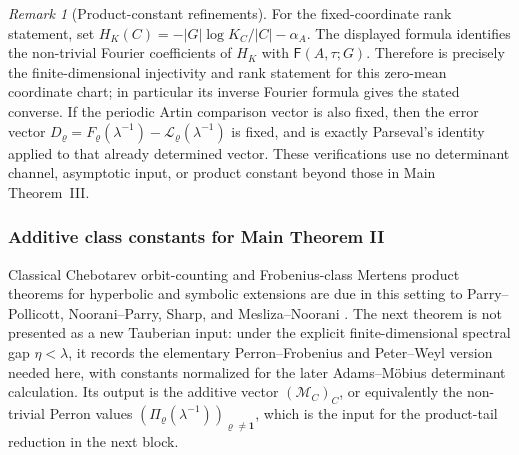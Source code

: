 \documentclass[11pt,a4paper]{amsart}
\theoremstyle{plain}
\theoremstyle{definition}
\theoremstyle{remark}
\newtheorem{remark}[theorem]{Remark}
\begin{document}
\begin{remark}[Product-constant refinements]
  For the fixed-coordinate rank statement, set
  \(H_K(C)=-|G|\log K_C/|C|-\alpha_A\).  The displayed formula identifies the
  non-trivial Fourier coefficients of \(H_K\) with
  \(\mathsf F(A,\tau;G)\).  Therefore
   is precisely the
  finite-dimensional injectivity and rank statement for this zero-mean
  coordinate chart; in particular its inverse Fourier formula gives the stated
  converse.  If the periodic Artin comparison vector is also fixed, then the
  error vector
  \(D_\varrho=F_\varrho(\lambda^{-1})-
  \mathcal L_\varrho(\lambda^{-1})\) is fixed, and
   is exactly Parseval's identity applied to
  that already determined vector.  These verifications use no determinant channel, asymptotic input, or product
constant beyond those in Main Theorem~III.
\end{remark}

\subsubsection{Additive class constants for Main Theorem II}

Classical Chebotarev orbit-counting and Frobenius-class Mertens product
theorems for hyperbolic and symbolic extensions are due in this setting to
Parry--Pollicott, Noorani--Parry, Sharp, and Mesliza--Noorani
\cite{ParryPollicott1986Chebotarev,NooraniParry1992ChebotarevShifts,Sharp1991Mertens,MeslizaNoorani1999FrobeniusMertens}.  The next theorem is
not presented as a new Tauberian input: under the explicit finite-dimensional
spectral gap \(\eta<\lambda\), it records the elementary Perron--Frobenius and
Peter--Weyl version needed here, with constants normalized for the later
Adams--M\"obius determinant calculation.
Its output is the additive vector \((\mathcal M_C)_C\), or equivalently the
non-trivial Perron values \((\Pi_\varrho(\lambda^{-1}))_{\varrho\ne\mathbf1}\),
which is the input for the product-tail reduction in the next block.
\end{document}
